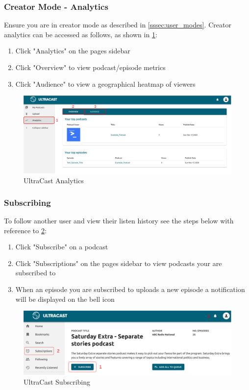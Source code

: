 \documentclass[../report.tex]{subfiles}
\begin{document}
\subsubsection{Creator Mode - Analytics}

Ensure you are in creator mode as described in \cref{sssec:user_modes}.
Creator analytics can be accessed as follows, as shown in \cref{fig:UM_edit}:
\begin{enumerate}
    \item Click "Analytics" on the pages sidebar
    \item Click "Overview" to view podcast/episode metrics
    \item Click "Audience" to view a geographical heatmap of viewers
\end{enumerate}
\begin{figure}[ht]
    \centering
    \includegraphics[width=16cm]{resources/UM_Analytics}
    \caption{UltraCast Analytics}
    \label{fig:UM_edit} 
\end{figure}

\subsubsection{Subscribing}
To follow another user and view their listen history see the steps below with reference to \cref{fig:UM_subscribe}:
\begin{enumerate}
    \item Click "Subscribe" on a podcast
    \item Click "Subscriptions" on the pages sidebar to view podcasts your are subscribed to
    \item When an episode you are subscribed to uploads a new episode a notification will be displayed on the bell icon
\end{enumerate}
\begin{figure}[ht]
    \centering
    \includegraphics[width=16cm]{resources/UM_Subscribe}
    \caption{UltraCast Subscribing}
    \label{fig:UM_subscribe} 
\end{figure}
\end{document}
